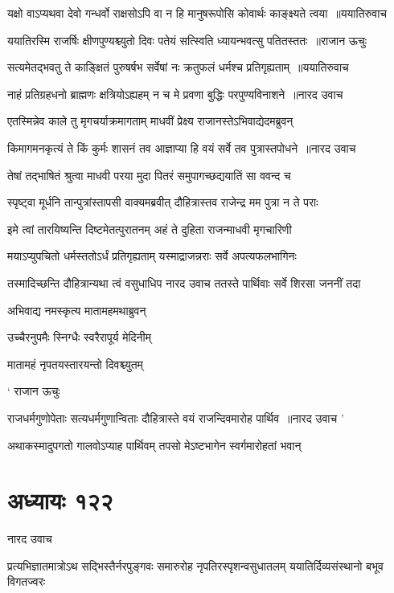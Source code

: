 \threelineshloka
{यक्षो वाऽप्यथवा देवो गन्धर्वो राक्षसोऽपि वा}
{न हि मानुषरूपोसि कोवार्थः काङ्क्ष्यते त्वया ॥ययातिरुवाच}
{}


\threelineshloka
{ययातिरस्मि राजर्षिः क्षीणपुण्यश्च्युतो दिवः}
{पतेयं सत्स्विति ध्यायन्भवत्सु पतितस्ततः ॥राजान ऊचुः}
{}


\threelineshloka
{सत्यमेतद्भवतु ते काङ्क्षितं पुरुषर्षभ}
{सर्वेषां नः क्रतुफलं धर्मश्च प्रतिगृह्यताम् ॥ययातिरुवाच}
{}


\threelineshloka
{नाहं प्रतिग्रहधनो ब्राह्मणः क्षत्रियोऽह्यहम्}
{न च मे प्रवणा बुद्धिः परपुण्यविनाशने ॥नारद उवाच}
{}


\twolineshloka
{एतस्मिन्नेव काले तु मृगचर्याक्रमागताम्}
{माधवीं प्रेक्ष्य राजानस्तेऽभिवाद्येदमब्रुवन्}


\threelineshloka
{किमागमनकृत्यं ते किं कुर्मः शासनं तव}
{आज्ञाप्या हि वयं सर्वे तव पुत्रास्तपोधने ॥नारद उवाच}
{}


\twolineshloka
{तेषां तद्भाषितं श्रुत्वा माधवी परया मुदा}
{पितरं समुपागच्छद्ययातिं सा ववन्द च}


\twolineshloka
{स्पृष्ट्वा मूर्धनि तान्पुत्रांस्तापसी वाक्यमब्रवीत्}
{दौहित्रास्तव राजेन्द्र मम पुत्रा न ते पराः}


\twolineshloka
{इमे त्वां तारयिष्यन्ति दिष्टमेतत्पुरातनम्}
{अहं ते दुहिता राजन्माधवी मृगचारिणी}


\twolineshloka
{मयाऽप्युपचितो धर्मस्ततोऽर्धं प्रतिगृह्यताम्}
{यस्माद्राजन्नराः सर्वे अपत्यफलभागिनः}


\threelineshloka
{तस्मादिच्छन्ति दौहित्रान्यथा त्वं वसुधाधिप}
{नारद उवाच}
{ततस्ते पार्थिवाः सर्वे शिरसा जननीं तदा}


अभिवाद्य नमस्कृत्य मातामहमथाब्रुवन्

उच्चैरनुपमैः स्निग्धैः स्वरैरापूर्य मेदिनीम्

मातामहं नृपतयस्तारयन्तो दिवश्च्युतम्

` राजान ऊचुः


\threelineshloka
{राजधर्मगुणोपेताः सत्यधर्मगुणान्विताः}
{दौहित्रास्ते वयं राजन्दिवमारोह पार्थिव ॥नारद उवाच}
{'}


\twolineshloka
{अथाकस्मादुपगतो गालवोऽप्याह पार्थिवम्}
{तपसो मेऽष्टभागेन स्वर्गमारोहतां भवान्}


\chapter{अध्यायः १२२}
\twolineshloka
{नारद उवाच}
{}


\threelineshloka
{प्रत्यभिज्ञातमात्रोऽथ सद्भिस्तैर्नरपुङ्गवः}
{समारुरोह नृपतिरस्पृशन्वसुधातलम्}
{ययातिर्दिव्यसंस्थानो बभूव विगतज्वरः}


